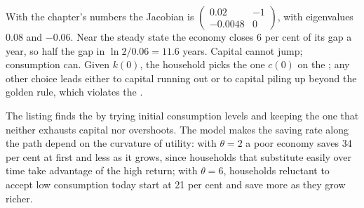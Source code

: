 With the chapter's numbers the Jacobian is $\begin{pmatrix} 0.02 & -1 \\ -0.0048 & 0 \end{pmatrix}$, with eigenvalues 0.08 and $-0.06$. Near the steady state the economy closes 6 per cent of its gap a year, so
half the gap in $\ln 2/0.06 = 11.6$ years. Capital cannot jump; consumption can. Given $k(0)$, the household picks the one $c(0)$ on the ; any other choice
leads either to capital running out or to capital piling up beyond the golden rule, which violates the .

\label{lst:b2:ramsey-model:shooting}

\label{out:b2:ramsey-model:shooting}

The listing finds the  by trying initial consumption levels and keeping the one that neither exhausts capital
nor overshoots. The model makes the saving rate along the path depend on the curvature of utility: with $\theta = 2$ a poor economy saves 34 per cent at first and less
as it grows, since households that substitute easily over time take advantage of the high return; with $\theta = 6$, households
reluctant to accept low consumption today start at 21 per cent and save more as they grow richer.


